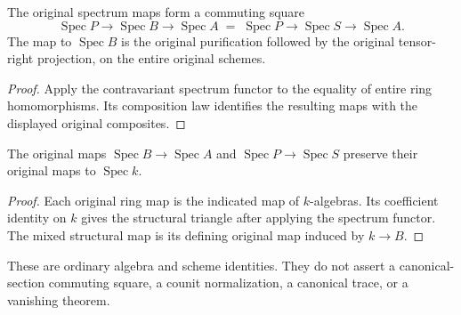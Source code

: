\begin{lemma}
\label{lem:kn-mixed-purification-original-scheme-square}
\leanok
The original spectrum maps form a commuting square
\[
 \operatorname{Spec}P\longrightarrow\operatorname{Spec}B
 \longrightarrow\operatorname{Spec}A
 \;=\;
 \operatorname{Spec}P\longrightarrow\operatorname{Spec}S
 \longrightarrow\operatorname{Spec}A.
\]
The map to $\operatorname{Spec}B$ is the original purification followed
by the original tensor-right projection, on the entire original schemes.
\end{lemma}
\begin{proof}
Apply the contravariant spectrum functor to the equality of entire
ring homomorphisms.  Its composition law identifies the resulting maps
with the displayed original composites.
\end{proof}

\begin{lemma}
\label{lem:kn-mixed-purification-original-field-triangles}
\leanok
The original maps $\operatorname{Spec}B\to\operatorname{Spec}A$ and
$\operatorname{Spec}P\to\operatorname{Spec}S$ preserve their original
maps to $\operatorname{Spec}k$.
\end{lemma}
\begin{proof}
Each original ring map is the indicated map of $k$-algebras.  Its
coefficient identity on $k$ gives the structural triangle after applying
the spectrum functor.  The mixed structural map is its defining original
map induced by $k\to B$.
\end{proof}

These are ordinary algebra and scheme identities.  They do not assert a
canonical-section commuting square, a counit normalization, a canonical
trace, or a vanishing theorem.
